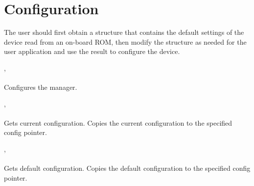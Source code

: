 	
	

	

	\section{Configuration}
		The user should first obtain a structure that contains the default settings of the device read from an on-board ROM, 
		then modify the structure as needed for the user application and use the result to configure the device.\par


		\deviceconfig, \\ \\
		Configures the \textsf{\prefix manager}.\par

		\deviceconfig, \\ \\
		Gets current configuration. Copies the current configuration to the specified config pointer.\par

		\deviceconfig, \\ \\
		Gets default configuration. Copies the default configuration to the specified config pointer.\par


	



	
